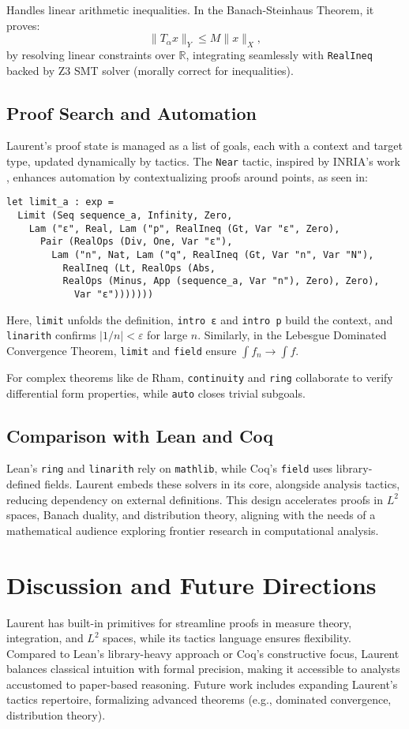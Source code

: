 \documentclass[12pt,twoside,draft]{cmpart}
\begin{document}
Handles linear arithmetic inequalities. In the Banach-Steinhaus Theorem, it proves:
\[
\| T_\alpha x \|_Y \leq M \| x \|_X,
\]
by resolving linear constraints over $\mathbb{R}$, integrating seamlessly with \texttt{RealIneq} backed by Z3 SMT solver (morally correct for inequalities).

\subsection{Proof Search and Automation}
Laurent’s proof state is managed as a list of goals, each with a context
and target type, updated dynamically by tactics. The \texttt{Near} tactic,
inspired by INRIA’s work \cite{af18}, enhances automation by contextualizing
proofs around points, as seen in:

\begin{verbatim}
let limit_a : exp =
  Limit (Seq sequence_a, Infinity, Zero,
    Lam ("ε", Real, Lam ("p", RealIneq (Gt, Var "ε", Zero),
      Pair (RealOps (Div, One, Var "ε"),
        Lam ("n", Nat, Lam ("q", RealIneq (Gt, Var "n", Var "N"),
          RealIneq (Lt, RealOps (Abs,
          RealOps (Minus, App (sequence_a, Var "n"), Zero), Zero),
            Var "ε")))))))
\end{verbatim}

Here, \texttt{limit} unfolds the definition, \texttt{intro ε} and \texttt{intro p}
build the context, and \texttt{linarith} confirms $|1/n| < \varepsilon$ for
large $n$. Similarly, in the Lebesgue Dominated Convergence Theorem,
\texttt{limit} and \texttt{field} ensure $\int f_n \to \int f$.

For complex theorems like de Rham, \texttt{continuity} and \texttt{ring}
collaborate to verify differential form properties, while \texttt{auto}
closes trivial subgoals.

\subsection{Comparison with Lean and Coq}
Lean’s \texttt{ring} and \texttt{linarith} rely on \texttt{mathlib},
while Coq’s \texttt{field} uses library-defined fields. Laurent embeds
these solvers in its core, alongside analysis tactics, reducing dependency
on external definitions. This design accelerates proofs in $L^2$ spaces,
Banach duality, and distribution theory, aligning with the needs of a
mathematical audience exploring frontier research in computational analysis.

\section{Discussion and Future Directions}
Laurent has built-in primitives for streamline proofs in measure theory, integration, and $L^2$ spaces,
while its tactics language ensures flexibility. Compared to Lean’s library-heavy approach
or Coq’s constructive focus, Laurent balances classical intuition with formal precision,
making it accessible to analysts accustomed to paper-based reasoning. Future work includes
expanding Laurent’s tactics repertoire, formalizing advanced
theorems (e.g., dominated convergence, distribution theory).
\end{document}
